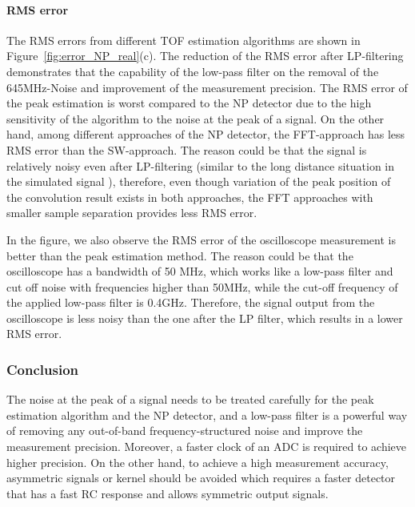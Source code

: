 \paragraph{RMS error}
The RMS errors from different TOF estimation algorithms are shown in Figure~\ref{fig:error_NP_real}(c). The reduction of the RMS error after LP-filtering demonstrates that the capability of the low-pass filter on the removal of the 645MHz-Noise and improvement of the measurement precision. The RMS error of the peak estimation is worst compared to the NP detector due to the high sensitivity of the algorithm to the noise at the peak of a signal. On the other hand, among different approaches of the NP detector, the FFT-approach has less RMS error than the SW-approach. The reason could be that the signal is relatively noisy even after LP-filtering (similar to the long distance situation in the simulated signal ), therefore, even though variation of the peak position of the convolution result exists in both approaches, the FFT approaches with smaller sample separation provides less RMS error.\par
In the figure, we also observe the RMS error of the oscilloscope measurement is better than the peak estimation method. The reason could be that the oscilloscope has a bandwidth of 50 MHz, which works like a low-pass filter and cut off noise with frequencies higher than 50MHz, while the cut-off frequency of the applied low-pass filter is 0.4GHz. Therefore, the signal output from the oscilloscope is less noisy than the one after the LP filter, which results in a lower RMS error. \par




\subsubsection{Conclusion}
The noise at the peak of a signal needs to be treated carefully for the peak estimation algorithm and the NP detector, and a low-pass filter is a powerful way of removing any out-of-band frequency-structured noise and improve the measurement precision. Moreover, a faster clock of an ADC is required to achieve higher precision. On the other hand, to achieve a high measurement accuracy, asymmetric signals or kernel should be avoided which requires a faster detector that has a fast RC response and allows symmetric output signals.



